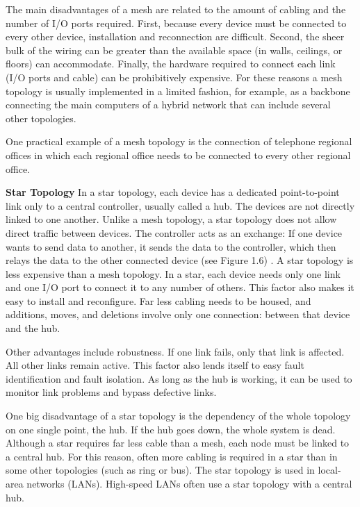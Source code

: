 The main disadvantages of a mesh are related to the amount of cabling and the number of I/O ports required. First, because every device must be connected to every other device, installation and reconnection are difficult. Second, the sheer bulk of the wiring can be greater than the available space (in walls, ceilings, or floors) can accommodate. Finally, the hardware required to connect each link (I/O ports and cable) can be prohibitively expensive. For these reasons a mesh topology is usually implemented in a limited fashion, for example, as a backbone connecting the main computers of a hybrid network that can include several other topologies.

One practical example of a mesh topology is the connection of telephone regional offices in which each regional office needs to be connected to every other regional office.

\textbf{Star Topology} In a star topology, each device has a dedicated point-to-point link only to a central controller, usually called a hub. The devices are not directly linked to one another. Unlike a mesh topology, a star topology does not allow direct traffic between devices. The controller acts as an exchange: If one device wants to send data to another, it sends the data to the controller, which then relays the data to the other connected device (see Figure 1.6) . A star topology is less expensive than a mesh topology. In a star, each device needs only one link and one I/O port to connect it to any number of others. This factor also makes it easy to install and reconfigure. Far less cabling needs to be housed, and additions, moves, and deletions involve only one connection: between that device and the hub.

Other advantages include robustness. If one link fails, only that link is affected. All other links remain active. This factor also lends itself to easy fault identification and fault isolation. As long as the hub is working, it can be used to monitor link problems and bypass defective links.

One big disadvantage of a star topology is the dependency of the whole topology on one single point, the hub. If the hub goes down, the whole system is dead. Although a star requires far less cable than a mesh, each node must be linked to a central hub. For this reason, often more cabling is required in a star than in some other topologies (such as ring or bus). The star topology is used in local-area networks (LANs). High-speed LANs often use a star topology with a central hub.


